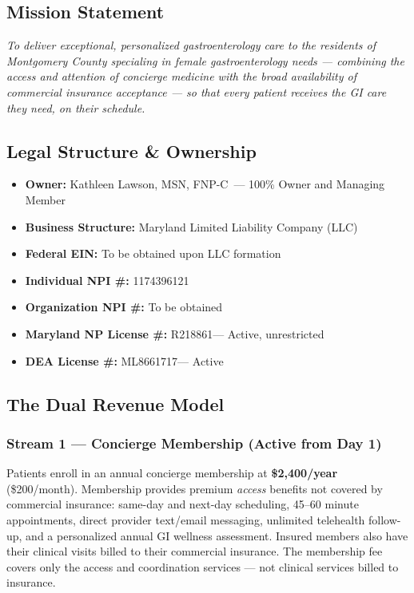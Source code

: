 \documentclass[11pt,letterpaper]{article}
\newcommand{\ownername}{Kathleen Lawson}
\newcommand{\ownercredentials}{MSN, FNP-C}
\newcommand{\ownerlicense}{R218861}
\newcommand{\ownerdealicense}{ML8661717}
\newcommand{\ownernpi}{1174396121}
\begin{document}
\subsection{Mission Statement}

\begin{missionbox}
\textit{To deliver exceptional, personalized gastroenterology care to the residents of Montgomery County specialing in female gastroenterology needs --- combining the access and attention of concierge medicine with the broad availability of commercial insurance acceptance --- so that every patient receives the GI care they need, on their schedule.}
\end{missionbox}

\subsection{Legal Structure \& Ownership}

\begin{itemize}
  \item \textbf{Owner:} \ownername, \ownercredentials\ --- 100\% Owner and Managing Member
  \item \textbf{Business Structure:} Maryland Limited Liability Company (LLC)
  \item \textbf{Federal EIN:} To be obtained upon LLC formation
  \item \textbf{Individual NPI \#:} \ownernpi
  \item \textbf{Organization NPI \#:} To be obtained
  \item \textbf{Maryland NP License \#:} \ownerlicense --- Active, unrestricted
  \item \textbf{DEA License \#:} \ownerdealicense --- Active
\end{itemize}


\subsection{The Dual Revenue Model}

\subsubsection{Stream 1 --- Concierge Membership (Active from Day 1)}

Patients enroll in an annual concierge membership at \textbf{\$2,400/year} (\$200/month). Membership provides premium \textit{access} benefits not covered by commercial insurance: same-day and next-day scheduling, 45--60 minute appointments, direct provider text/email messaging, unlimited telehealth follow-up, and a personalized annual GI wellness assessment. Insured members also have their clinical visits billed to their commercial insurance. The membership fee covers only the access and coordination services --- not clinical services billed to insurance.
\end{document}
